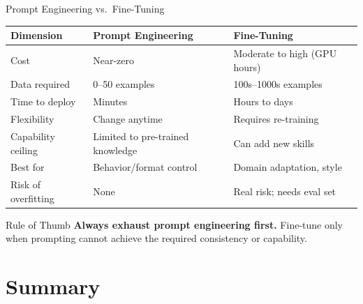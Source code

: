 \documentclass{beamer}
\begin{document}
\begin{frame}{Prompt Engineering vs.\ Fine-Tuning}
    \begin{table}
        \centering
        \small
        \begin{tabular}{@{}lll@{}}
            \toprule
            \textbf{Dimension} & \textbf{Prompt Engineering} & \textbf{Fine-Tuning} \\ \midrule
            Cost               & Near-zero                    & Moderate to high (GPU hours) \\
            Data required      & 0--50 examples               & 100s--1000s examples        \\
            Time to deploy     & Minutes                      & Hours to days               \\
            Flexibility        & Change anytime               & Requires re-training        \\
            Capability ceiling & Limited to pre-trained knowledge & Can add new skills      \\
            Best for           & Behavior/format control      & Domain adaptation, style    \\
            Risk of overfitting& None                         & Real risk; needs eval set   \\ \bottomrule
        \end{tabular}
    \end{table}

    \begin{alertblock}{Rule of Thumb}
        \textbf{Always exhaust prompt engineering first.}
        Fine-tune only when prompting cannot achieve the required consistency or capability.
    \end{alertblock}
\end{frame}

\section{Summary}
\end{document}
